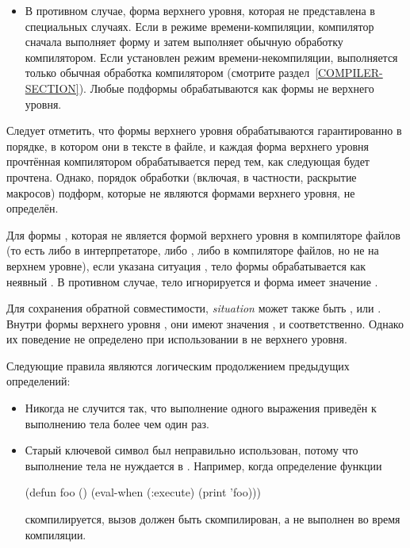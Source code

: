 \begin{newer}
\begin{defspec}
\begin{itemize}
   \item В противном случае, форма верхнего уровня, которая не представлена в
     специальных случаях. Если в режиме времени-компиляции, компилятор сначала
     выполняет форму и затем выполняет обычную обработку компилятором. Если
     установлен режим времени-некомпиляции, выполняется только обычная обработка
     компилятором (смотрите раздел~\ref{COMPILER-SECTION}).
     Любые подформы обрабатываются как формы не верхнего уровня.
\end{itemize}

  Следует отметить, что формы верхнего уровня обрабатываются гарантированно в
  порядке, в котором они в тексте в файле, и каждая форма верхнего
  уровня прочтённая компилятором обрабатывается перед тем, как следующая будет
  прочтена.
  Однако, порядок обработки (включая, в частности, раскрытие макросов) подформ,
  которые не являются формами верхнего уровня, не определён.

  Для формы , которая не является формой верхнего уровня в
  компиляторе файлов (то есть либо в интерпретаторе, либо , либо в
  компиляторе файлов, но не на верхнем уровне), если указана ситуация
  , тело формы обрабатывается как неявный . В противном
  случае, тело игнорируется и форма  имеет значение .

  Для сохранения обратной совместимости, \emph{situation} может также быть
  ,  или .
  Внутри формы верхнего уровня , они имеют значения
  ,  и  соответственно.
  Однако их поведение не определено при использовании в  не
  верхнего уровня.

  Следующие правила являются логическим продолжением предыдущих определений:

  \begin{itemize}

   \item Никогда не случится так, что выполнение одного 
     выражения приведён к выполнению тела более чем один раз.

   \item Старый ключевой символ  был неправильно использован, потому
     что выполнение тела не нуждается в . Например, когда определение
     функции
     \begin{lisp}
     (defun foo () (eval-when (:execute) (print 'foo)))
     \end{lisp}
     скомпилируется,
     вызов  должен быть скомпилирован, а не выполнен во время
     компиляции.


\end{itemize}
\end{defspec}
\end{newer}
